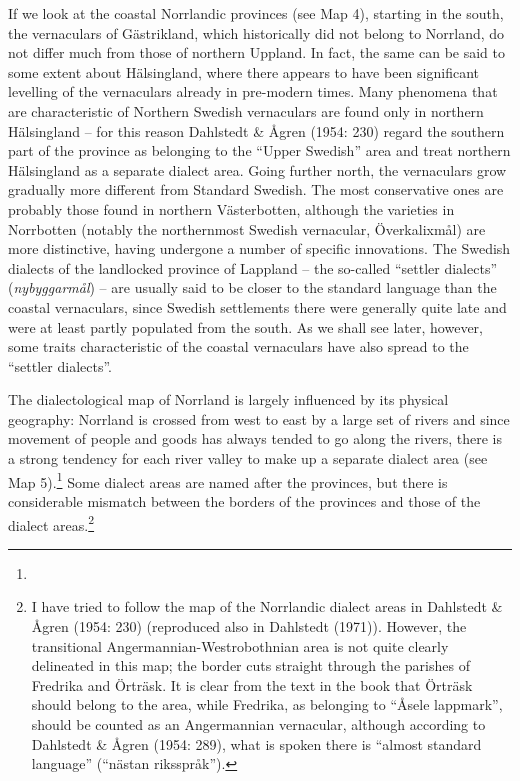 If we look at the coastal Norrlandic provinces (see Map 4), starting in the south, the vernaculars of Gästrikland, which historically did not belong to Norrland, do not differ much from those of northern Uppland. In fact, the same can be said to some extent about Hälsingland, where there appears to have been significant levelling of the vernaculars already in pre-modern times. Many phenomena that are characteristic of Northern Swedish vernaculars are found only in northern Hälsingland – for this reason Dahlstedt \& Ågren (1954: 230) regard the southern part of the province as belonging to the “Upper Swedish” area and treat northern Hälsingland as a separate dialect area. Going further north, the vernaculars grow gradually more different from Standard Swedish. The most conservative ones are probably those found in northern Västerbotten, although the varieties in Norrbotten (notably the northernmost Swedish vernacular, Överkalixmål) are more distinctive, having undergone a number of specific innovations. The Swedish dialects of the landlocked province of Lappland – the so-called “settler dialects” (\textit{nybyggarmål}) – are usually said to be closer to the standard language than the coastal vernaculars, since Swedish settlements there were generally quite late and were at least partly populated from the south. As we shall see later, however, some traits characteristic of the coastal vernaculars have also spread to the “settler dialects”. 

The dialectological map of Norrland is largely influenced by its physical geography: Norrland is crossed from west to east by a large set of rivers and since movement of people and goods has always tended to go along the rivers, there is a strong tendency for each river valley to make up a separate dialect area (see Map 5).\footnote{ } Some dialect areas are named after the provinces, but there is considerable mismatch between the borders of the provinces and those of the dialect areas.\footnote{ I have tried to follow the map of the Norrlandic dialect areas in Dahlstedt \& Ågren (1954: 230) (reproduced also in Dahlstedt (1971)). However, the transitional Angermannian-Westrobothnian area is not quite clearly delineated in this map; the border cuts straight through the parishes of Fredrika and Örträsk. It is clear from the text in the book that Örträsk should belong to the area, while Fredrika, as belonging to “Åsele lappmark”, should be counted as an Angermannian vernacular, although according to Dahlstedt \& Ågren (1954: 289), what is spoken there is “almost standard language” (“nästan riksspråk”). } 

